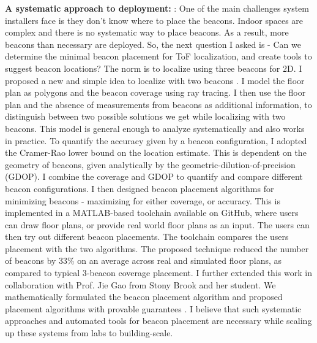 \documentclass[10pt]{article}
\begin{document}
\textbf{A systematic approach to deployment: }:
One of the main challenges system installers face is they don't know where to place the beacons. Indoor spaces are complex and there is no systematic way to place beacons. 
As a result, more beacons than necessary are deployed. 
So, the next question I asked is - Can we determine the minimal beacon placement for ToF localization, and create tools to suggest beacon locations? The norm is to localize using three beacons for 2D.  I proposed a new and simple idea to localize with two beacons \cite{rajagopal2016beacon}. I model the floor plan as polygons and the beacon coverage using ray tracing. I then use the floor plan and the absence of measurements from beacons as additional information, to distinguish between two possible solutions we get while localizing with two beacons. This model is general enough to analyze systematically and also works in practice. %
To quantify the accuracy given by a beacon configuration, I adopted the Cramer-Rao lower bound on the location estimate. %
This is dependent on the geometry of beacons, given analytically by the geometric-dilution-of-precision (GDOP).  %
I combine the coverage and GDOP to quantify and compare different beacon configurations. I then designed beacon placement algorithms for minimizing beacons - maximizing for either coverage, or accuracy. This is implemented in a MATLAB-based toolchain available on GitHub, where users can draw floor plans, or provide real world floor plans as an input. The users can then try out different beacon placements.  %
The toolchain compares the users placement with the two algorithms. The proposed technique reduced the number of beacons by $33\%$ on an average across real and simulated floor plans, as compared to typical 3-beacon coverage placement. I further extended this work in collaboration with Prof. Jie Gao from Stony Brook and her student. We mathematically formulated the beacon placement algorithm and proposed placement algorithms with provable guarantees \cite{beaconplacementtheory}. I believe that such systematic approaches and automated tools for beacon placement are necessary while scaling up these systems from labs to building-scale. \\
\end{document}
